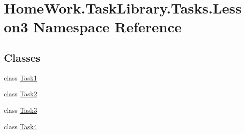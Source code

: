 \hypertarget{namespace_home_work_1_1_task_library_1_1_tasks_1_1_lesson3}{}\section{Home\+Work.\+Task\+Library.\+Tasks.\+Lesson3 Namespace Reference}
\label{namespace_home_work_1_1_task_library_1_1_tasks_1_1_lesson3}
\subsection*{Classes}
\begin{DoxyCompactItemize}
\item 
class \mbox{\hyperlink{class_home_work_1_1_task_library_1_1_tasks_1_1_lesson3_1_1_task1}{Task1}}
\item 
class \mbox{\hyperlink{class_home_work_1_1_task_library_1_1_tasks_1_1_lesson3_1_1_task2}{Task2}}
\item 
class \mbox{\hyperlink{class_home_work_1_1_task_library_1_1_tasks_1_1_lesson3_1_1_task3}{Task3}}
\item 
class \mbox{\hyperlink{class_home_work_1_1_task_library_1_1_tasks_1_1_lesson3_1_1_task4}{Task4}}
\end{DoxyCompactItemize}
